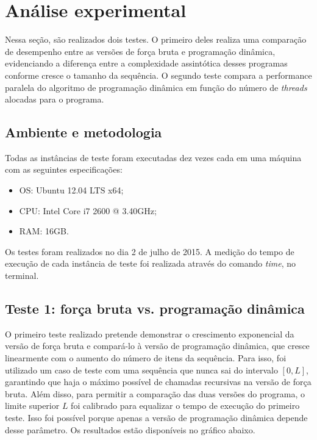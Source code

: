\documentclass[10pt,a4paper]{article}
\numberwithin{equation}{section}
\begin{document}
\section{Análise experimental}

Nessa seção, são realizados dois testes. O primeiro deles realiza uma comparação de desempenho entre as versões de força bruta e programação dinâmica, evidenciando a diferença entre a complexidade assintótica desses programas conforme cresce o tamanho da sequência. O segundo teste compara a performance paralela do algoritmo de programação dinâmica em função do número de \emph{threads} alocadas para o programa.

\subsection{Ambiente e metodologia}

Todas as instâncias de teste foram executadas dez vezes cada em uma máquina com as seguintes especificações:

\begin{itemize}
    \item OS: Ubuntu 12.04 LTS x64;
    \item CPU: Intel Core i7 2600 @ 3.40GHz;
    \item RAM: 16GB.
\end{itemize}

Os testes foram realizados no dia 2 de julho de 2015. A medição do tempo de execução de cada instância de teste foi realizada através do comando \emph{time}, no terminal.

\subsection{Teste 1: força bruta vs. programação dinâmica}

O primeiro teste realizado pretende demonstrar o crescimento exponencial da versão de força bruta e compará-lo à versão de programação dinâmica, que cresce linearmente com o aumento do número de itens da sequência. Para isso, foi utilizado um caso de teste com uma sequência que nunca sai do intervalo $[0,L]$, garantindo que haja o máximo possível de chamadas recursivas na versão de força bruta. Além disso, para permitir a comparação das duas versões do programa, o limite superior $L$ foi calibrado para equalizar o tempo de execução do primeiro teste. Isso foi possível porque apenas a versão de programação dinâmica depende desse parâmetro. Os resultados estão disponíveis no gráfico abaixo.
\end{document}
